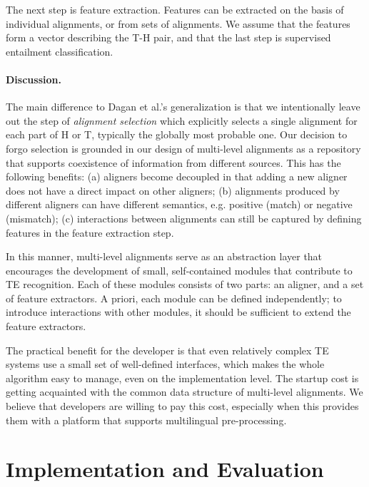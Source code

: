 \documentclass[11pt,letterpaper]{article}
\begin{document}
The next step is feature extraction. Features can be extracted on the
basis of individual alignments, or from sets of alignments. We assume
that the features form a vector describing the T-H pair, and that the
last step is supervised entailment classification.

\paragraph{Discussion.} The main difference to Dagan et al.'s
generalization is that we intentionally leave out the step of {\em
  alignment   selection} which explicitly selects a single alignment
for each part of H or T, typically the globally most probable one. 
Our decision to forgo selection is grounded in our design of
multi-level alignments as a repository that supports coexistence of
information from different sources. This has the following benefits:
(a) aligners become decoupled in that adding a new aligner does not
have a direct impact on other aligners; 
(b) alignments produced by different aligners
can have different semantics, e.g. positive (match) or negative
(mismatch); (c) interactions between alignments can still be captured
by defining features in the feature extraction step.

In this manner, multi-level alignments serve as an abstraction layer
that encourages the development of small, self-contained modules that
contribute to TE recognition. Each of these modules consists of two
parts: an aligner, and a set of feature extractors. A priori, each
module can be defined independently; to introduce interactions with
other modules, it should be sufficient to extend the feature
extractors.

The practical benefit for the developer is that even relatively
complex TE systems use a small set of well-defined interfaces, which
makes the whole algorithm easy to manage, even on the implementation
level. The startup cost is getting acquainted with the common data
structure of multi-level alignments. We believe that developers are
willing to pay this cost, especially when this provides them with a
platform that supports multilingual pre-processing.

\section{Implementation and Evaluation}
\label{sec:impl}
\end{document}
